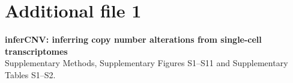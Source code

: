 \clearpage
\section*{Additional file 1}\label{sec:additional_file1}

\noindent\textbf{inferCNV: inferring copy number alterations from single-cell transcriptomes}\\
Supplementary Methods, Supplementary Figures S1--S11 and Supplementary Tables S1--S2.

\setcounter{figure}{0}
\renewcommand{\thefigure}{S\arabic{figure}}
\setcounter{table}{0}
\renewcommand{\thetable}{S\arabic{table}}




\clearpage
{}
\SuppModelsFigure
{}
\SuppAlleleFigure
{}
